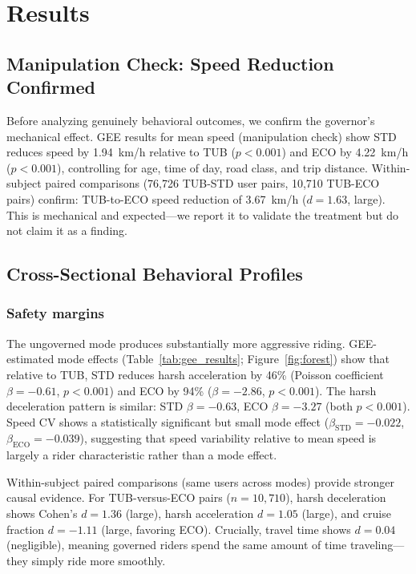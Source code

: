 \section{Results}
\label{sec:results}

\subsection{Manipulation Check: Speed Reduction Confirmed}
\label{sec:res_manipulation}

Before analyzing genuinely behavioral outcomes, we confirm the governor's mechanical effect. GEE results for mean speed (manipulation check) show STD reduces speed by 1.94~km/h relative to TUB ($p < 0.001$) and ECO by 4.22~km/h ($p < 0.001$), controlling for age, time of day, road class, and trip distance. Within-subject paired comparisons (76,726 TUB-STD user pairs, 10,710 TUB-ECO pairs) confirm: TUB-to-ECO speed reduction of 3.67~km/h ($d = 1.63$, large). This is mechanical and expected---we report it to validate the treatment but do not claim it as a finding.

\subsection{Cross-Sectional Behavioral Profiles}
\label{sec:res_crosssectional}

\subsubsection{Safety margins}

The ungoverned mode produces substantially more aggressive riding. GEE-estimated mode effects (Table~\ref{tab:gee_results}; Figure~\ref{fig:forest}) show that relative to TUB, STD reduces harsh acceleration by 46\% (Poisson coefficient $\beta = -0.61$, $p < 0.001$) and ECO by 94\% ($\beta = -2.86$, $p < 0.001$). The harsh deceleration pattern is similar: STD $\beta = -0.63$, ECO $\beta = -3.27$ (both $p < 0.001$). Speed CV shows a statistically significant but small mode effect ($\beta_{\text{STD}} = -0.022$, $\beta_{\text{ECO}} = -0.039$), suggesting that speed variability relative to mean speed is largely a rider characteristic rather than a mode effect.

Within-subject paired comparisons (same users across modes) provide stronger causal evidence. For TUB-versus-ECO pairs ($n = 10{,}710$), harsh deceleration shows Cohen's $d = 1.36$ (large), harsh acceleration $d = 1.05$ (large), and cruise fraction $d = -1.11$ (large, favoring ECO). Crucially, travel time shows $d = 0.04$ (negligible), meaning governed riders spend the same amount of time traveling---they simply ride more smoothly.

